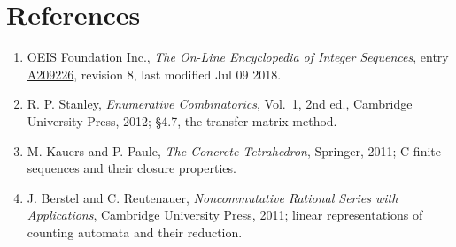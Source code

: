 \documentclass[11pt]{article}
\theoremstyle{definition}
\begin{document}
\section{References}

\begin{enumerate}

\item OEIS Foundation Inc., \emph{The On-Line Encyclopedia of Integer Sequences}, entry \href{https://oeis.org/A209226}{A209226}, revision 8, last modified Jul 09 2018.

\item R. P. Stanley, \emph{Enumerative Combinatorics}, Vol.~1, 2nd ed., Cambridge University Press, 2012; \S4.7, the transfer-matrix method.

\item M. Kauers and P. Paule, \emph{The Concrete Tetrahedron}, Springer, 2011; C-finite sequences and their closure properties.

\item J. Berstel and C. Reutenauer, \emph{Noncommutative Rational Series with Applications}, Cambridge University Press, 2011; linear representations of counting automata and their reduction.

\end{enumerate}
\end{document}
